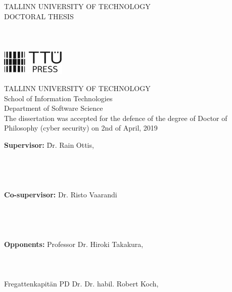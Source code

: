 \begin{centering}

{\large
TALLINN UNIVERSITY OF TECHNOLOGY \\
DOCTORAL THESIS \\
\ThesisNumber \\
}
\vspace{5.5CM}
{\huge
\bf{
\ThesisTitleENG \\
}
}
\vspace{4.2cm}
{\fontsize{16}{19.2} \selectfont \MakeUppercase{\AuthorName}} \\
\vspace{6cm}%
\includegraphics[height=12mm]{./img/TTU_kirjastus_ENG_mv_200x79.jpg}\\
\end{centering}
\thispagestyle{empty}
\newpage 


\thispagestyle{empty} 
{\noindent 
TALLINN UNIVERSITY OF TECHNOLOGY \\
School of Information Technologies\\
Department of Software Science \\
 }
\noindent
The dissertation was accepted for the defence of the degree of Doctor of Philosophy (cyber security) on 2nd of April, 2019\\
\vspace{-3mm}

\begin{tabbing}
\textbf{Supervisor:} \quad \quad\= Dr. Rain Ottis,\\
 \\
 \\
 \\
\\
\textbf{Co-supervisor:} 
\> Dr. Risto Vaarandi \\
 \\
 \\
 \\
\\
\textbf{Opponents:} 
\> Professor Dr. Hiroki Takakura,\\
 \\
 \\
\\
\> Fregattenkapit\"{a}n PD Dr. Dr. habil. Robert Koch, \\
 \\
 \\
\end{tabbing}

